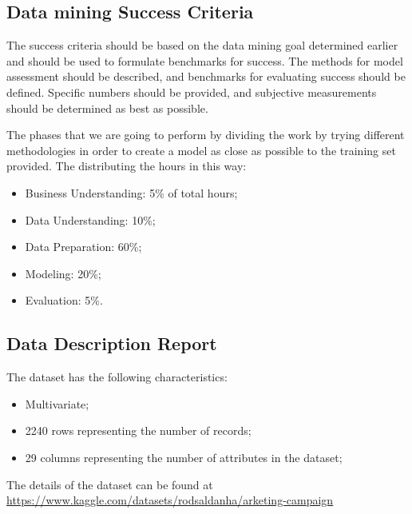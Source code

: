 \subsection{Data mining Success Criteria}
The success criteria should be based on the data mining goal determined earlier and should be used to formulate benchmarks for success. The methods for model assessment should be described, and benchmarks for evaluating success should be defined. Specific numbers should be provided, and subjective measurements should be determined as best as possible. 

The phases that we are going to perform by dividing the work by trying different methodologies in order to create a model as close as possible to the training set provided.
The distributing the hours in this way:
\begin{itemize}
\item Business Understanding: 5\% of total hours;
\item Data Understanding: 10\%;
\item Data Preparation: 60\%; 
\item Modeling: 20\%;
\item Evaluation: 5\%.
\end{itemize}

\subsection{Data Description Report}

The dataset has the following characteristics: 
\begin{itemize}
    \item Multivariate;
    \item 2240 rows representing the number of records;
    \item 29 columns representing the number of attributes in the dataset;
\end{itemize}

The details of the dataset can be found at \href{kaggle}{https://www.kaggle.com/datasets/rodsaldanha/arketing-campaign}

